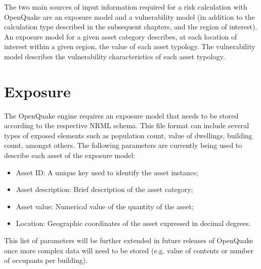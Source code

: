 The two main sources of input information required for a risk calculation with OpenQuake are an exposure model and a vulnerability model (in addition to the calculation type described in the subsequent chapters, and the region of interest). An exposure model for a given asset category describes, at each location of interest within a given region, the value of each asset typology. The vulnerability model describes the vulnerability characteristics of each asset typology.
\section{Exposure}
The OpenQuake engine requires an exposure model that needs to be stored according to the respective NRML schema. This file format can include several types of exposed elements such as population count, value of dwellings, building count, amongst others. The following parameters are currently being used to describe each asset of the exposure model: 

\begin{itemize}
\item Asset ID: A unique key used to identify the asset instance;
\item Asset description: Brief description of the asset category;
\item Asset value: Numerical value of the quantity of the asset;
\item Location: Geographic coordinates of the asset expressed in decimal degrees.
\end{itemize}

This list of parameters will be further extended in future releases of OpenQuake once more complex data will need to be stored (e.g. value of contents or number of occupants per building).  


